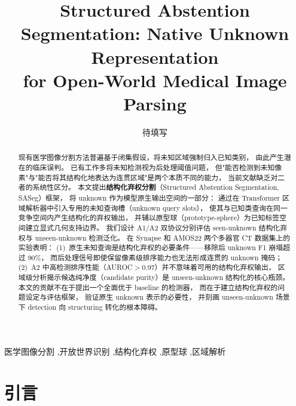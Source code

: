 \documentclass[3p,twocolumn,authoryear]{elsarticle}
\begin{document}
\begin{frontmatter}
\title{Structured Abstention Segmentation: Native Unknown Representation\\for Open-World Medical Image Parsing}

\author[addr1]{待填写}
\address[addr1]{待填写}

\begin{abstract}
现有医学图像分割方法普遍基于闭集假设，将未知区域强制归入已知类别，
由此产生潜在的临床误判。
已有工作多将未知检测视为后处理阈值问题，
但"能否检测到未知像素"与"能否将其结构化地表达为连贯区域"是两个本质不同的能力，
当前文献缺乏对二者的系统性区分。
本文提出\textbf{结构化弃权分割}（Structured Abstention Segmentation, SASeg）框架，
将 unknown 作为模型原生输出空间的一部分：
通过在 Transformer 区域解析器中引入专用的未知查询槽（unknown query slots），
使其与已知类查询在同一竞争空间内产生结构化的弃权输出，
并辅以原型球（prototype-sphere）为已知标签空间建立显式几何支持边界。
我们设计 A1/A2 双协议分别评估 seen-unknown 结构化弃权与 unseen-unknown 检测泛化。
在 Synapse 和 AMOS22 两个多器官 CT 数据集上的实验表明：
(1)~原生未知查询是结构化弃权的必要条件——移除后 unknown F1 崩塌超过 90\%，
    而后处理信号即使保留像素级排序能力也无法形成连贯的 unknown 掩码；
(2)~A2 中高检测排序性能（AUROC$>$0.97）并不意味着可用的结构化弃权输出，
    区域级分析揭示候选纯净度（candidate purity）是 unseen-unknown 结构化的核心瓶颈。
本文的贡献不在于提出一个全面优于 baseline 的检测器，
而在于建立结构化弃权的问题设定与评估框架，
验证原生 unknown 表示的必要性，
并刻画 unseen-unknown 场景下 detection 向 structuring 转化的根本障碍。
\end{abstract}

\begin{keyword}
医学图像分割 \sep 开放世界识别 \sep 结构化弃权 \sep 原型球 \sep 区域解析
\end{keyword}
\end{frontmatter}


%  
 
\section{引言}
\label{sec:intro}
 
\end{document}

